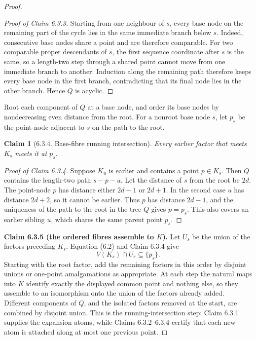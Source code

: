 \documentclass[a4paper,11pt,reqno]{amsart}
\theoremstyle{plain}
\newtheorem*{claim}{Claim}
\theoremstyle{definition}
\theoremstyle{remark}
\begin{document}
\begin{proof}
\begin{proof}[Proof of Claim 6.3.3]
Starting from one neighbour of \(s\), every base node on the remaining
part of the cycle lies in the same immediate branch below \(s\). Indeed,
consecutive base nodes share a point and are therefore comparable. For two
comparable proper descendants of \(s\), the first sequence coordinate after
\(s\) is the same, so a length-two step through a shared point cannot move
from one immediate branch to another. Induction along the remaining path
therefore keeps every base node in the first branch, contradicting that its
final node lies in the other branch. Hence \(Q\) is acyclic.
\end{proof}

Root each component of \(Q\) at a base node, and order its base nodes by
nondecreasing even distance from the root. For a nonroot base node \(s\), let
\(p_s\) be the point-node adjacent to \(s\) on the path to the root.

\begin{claim}[6.3.4. Base-fibre running intersection]

Every earlier factor that meets \(K_s\) meets it at \(p_s\).

\end{claim}
\begin{proof}[Proof of Claim 6.3.4]
Suppose \(K_u\) is earlier and contains a point
\(p\in K_s\). Then \(Q\) contains the length-two path \(s-p-u\). Let the
distance of \(s\) from the root be \(2d\). The point-node \(p\) has distance
either \(2d-1\) or \(2d+1\). In the second case \(u\) has distance \(2d+2\),
so it cannot be earlier. Thus \(p\) has distance \(2d-1\), and the uniqueness
of the path to the root in the tree \(Q\) gives \(p=p_s\). This also covers
an earlier sibling \(u\), which shares the same parent point \(p_s\).
\end{proof}

\medskip
\noindent\textbf{Claim 6.3.5 (the ordered fibres assemble to \(K\)).}
Let \(U_s\) be the union of the factors preceding \(K_s\). Equation (6.2)
and Claim 6.3.4 give
\[
V(K_s)\cap U_s\subseteq\{p_s\}.
\]
Starting with the root factor, add the remaining factors in this order by
disjoint unions or one-point amalgamations as appropriate. At each step the
natural maps into \(K\) identify exactly the displayed common point and
nothing else, so they assemble to an isomorphism onto the union of the
factors already added. Different components of \(Q\), and the isolated
factors removed at the start, are combined by disjoint union. This is the
running-intersection step: Claim 6.3.1 supplies the expansion atoms, while
Claims 6.3.2--6.3.4 certify that each new atom is attached along at most one
previous point.
\end{proof}
\end{document}

